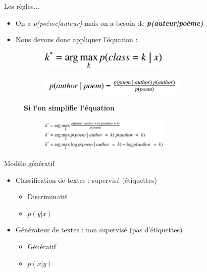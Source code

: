\documentclass[aspectratio=169,xcolor=dvipsnames, t]{beamer}
\begin{document}
\begin{frame}{Les règles...}
	\begin{itemize}
		\item On a \textit{p(poème|auteur)} mais on a besoin de \textbf{\textit{p(auteur|poème)}}
		\item Nous devons donc appliquer l'équation :
	\end{itemize}
	
	\begin{figure}
		\centering
		\begin{subfigure}{.5\textwidth}
			\centering
			\includegraphics[width=0.7\textwidth]{figures/eq2.png}
		\end{subfigure}%
		\begin{subfigure}{.5\textwidth}
			\centering
			\includegraphics[width=0.8\textwidth]{figures/eq3.png}
		\end{subfigure}
		\textbf{Si l'on simplifie l'équation}
		\begin{figure}
			\includegraphics[width=0.7\textwidth]{figures/img2.png}
		\end{figure}
	\end{figure}

\end{frame}





\begin{frame}{Modèle génératif}
	\begin{itemize}
		\item Classification de textes : supervisé (étiquettes)
		\begin{itemize}
			\item Discriminatif
			\item $p(y|x)$
		\end{itemize}
		\item Générateur de textes : non supervisé (pas d'étiquettes)		\begin{itemize}
			\item Génératif
			\item $p(x|y)$
		\end{itemize}
			
	\end{itemize}		
\end{frame}
\end{document}
